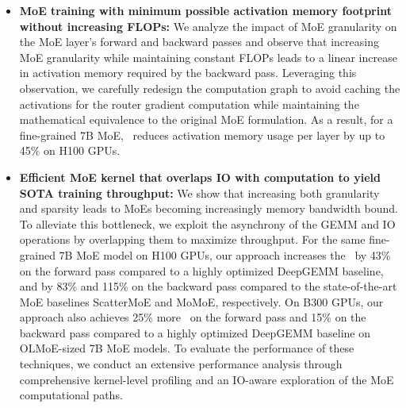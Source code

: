 \begin{itemize}
    \item \textbf{MoE training with minimum possible activation memory footprint without increasing FLOPs: } We analyze the impact of MoE granularity on the MoE layer's forward and backward passes and observe that increasing MoE granularity while maintaining constant FLOPs leads to a linear increase in activation memory required by the backward pass. Leveraging this observation, we carefully redesign the computation graph to avoid caching the activations for the router gradient computation while maintaining the mathematical equivalence to the original MoE formulation. As a result, for a fine-grained 7B MoE, \Algname\ reduces activation memory usage per layer by up to 45\% on H100 GPUs.
    
    \item \textbf{Efficient MoE kernel that overlaps IO with computation to yield SOTA training throughput:} We show that increasing both granularity and sparsity leads to MoEs becoming increasingly memory bandwidth bound. To alleviate this bottleneck, we exploit the asynchrony of the GEMM and IO operations by overlapping them to maximize throughput. For the same fine-grained 7B MoE model on H100 GPUs, our approach increases the \tflops~by 43\% on the forward pass compared to a highly optimized DeepGEMM baseline, and by 83\% and 115\% on the backward pass compared to the state-of-the-art MoE baselines ScatterMoE and MoMoE, respectively. On B300 GPUs, our approach also achieves 25\% more \tflops~on the forward pass and 15\% on the backward pass compared to a highly optimized DeepGEMM baseline on OLMoE-sized 7B MoE models. To evaluate the performance of these techniques, we conduct an extensive performance analysis through comprehensive kernel-level profiling and an IO-aware exploration of the MoE computational paths.
    
    

    
    

\end{itemize}
